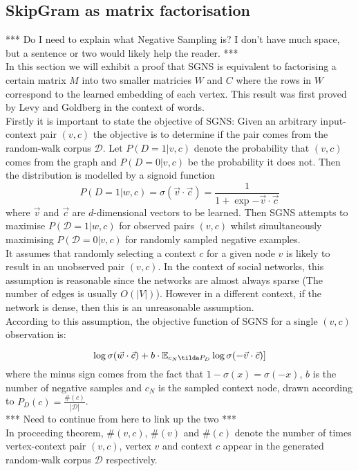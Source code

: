 \documentclass[a4paper]{article}
\renewcommand{\E}{\mathbb E}
\renewcommand{\D}{\mathcal{D}}
\begin{document}
\subsection{SkipGram as matrix factorisation}
*** Do I need to explain what Negative Sampling is? I don't have much space, but
a sentence or two would likely help the reader. ***\\

In this section we will exhibit a proof that SGNS is
equivalent to factorising a certain matrix $M$ into two smaller matricies $W$
and $C$ where the rows in $W$ correspond to the learned embedding of each vertex. This result was first proved by Levy and
Goldberg\cite{levy&goldberg} in the context of words.\\

Firstly it is important to state the objective of SGNS:
Given an arbitrary input-context pair $(v,c)$ the objective is to determine if
the pair comes from the random-walk corpus $\mathcal{D}$. Let $P(D = 1 | v, c)$
denote the probability that $(v,c)$ comes from the graph and $P(D = 0| v, c)$ be
the probability it does not. Then the distribution is modelled by a signoid
function
\[P(D = 1 | w, c) = \sigma(\vec{v} \cdot \vec{c}) = \frac{1}{1 + \exp{-\vec{v} \cdot \vec{c}}}\]
where $\vec{v}$ and $\vec{c}$ are $d$-dimensional vectors to be learned. Then
SGNS attempts to maximise $P(\mathcal{D} = 1 | w,c)$ for observed pairs $(v, c)$
whilst simultaneously maximising $P(\D = 0 | v, c)$ for randomly sampled
negative examples.\\
It assumes that randomly selecting a context $c$ for a given
node $v$ is likely to result in an unobserved pair $(v,c)$. In the context of
social networks, this assumption is reasonable since the networks are almost
always sparse (The number of edges is usually $O(|V|)$). However in a different
context, if the network is dense, then this is an unreasonable assumption.\\

According to this assumption, the objective function of SGNS for a single
$(v,c)$ observation is:

\[\log{\sigma(\vec{w} \cdot \vec{c})} + b \cdot \E_{c_{N} \tilda P_D}\log{\sigma(-\vec{v} \cdot \vec{c})}]\]
where the minus sign comes from the fact that $1 - \sigma(x) = \sigma(-x)$, $b$
is the number of negative samples and $c_N$ is the sampled context node, drawn
according to $P_D (c) = \frac{\#(c)}{| \D |}$.\\

*** Need to continue from here to link up the two ***\\
In proceeding theorem, $\#(v,c)$, $\#(v)$ and $\#(c)$ denote the number of times vertex-context pair
$(v,c)$, vertex $v$ and context $c$ appear in the generated random-walk corpus
$\mathcal{D}$ respectively.
\end{document}

